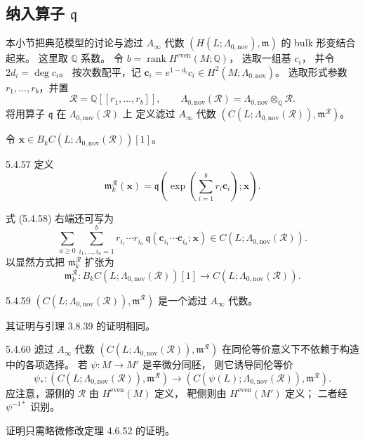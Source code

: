 
\subsection{纳入算子 $\mathfrak q$}
\label{subsec:5-4-5}

本小节把典范模型的讨论与滤过
$A_\infty$ 代数
$(H(L;\Lambda_{0,\mathrm{nov}}),\mathfrak m)$
的 bulk 形变结合起来。
这里取 $\mathbb Q$ 系数。
令
$b=\operatorname{rank}H^{\mathrm{even}}(M;\mathbb Q)$，
选取一组基 $c_i$，
并令 $2d_i=\deg c_i$。
按次数配平，记
$\mathbf c_i=e^{1-d_i}c_i
\in H^2(M;\Lambda_{0,\mathrm{nov}})$。
选取形式参数 $r_1,\ldots,r_b$，并置
\[
\mathcal R=\mathbb Q[[r_1,\ldots,r_b]],
\qquad
\Lambda_{0,\mathrm{nov}}(\mathcal R)
=\Lambda_{0,\mathrm{nov}}
\otimes_{\mathbb Q}\mathcal R.
\]
将用算子 $\mathfrak q$
在 $\Lambda_{0,\mathrm{nov}}(\mathcal R)$ 上
定义滤过 $A_\infty$ 代数
$(C(L;\Lambda_{0,\mathrm{nov}}(\mathcal R)),
\mathfrak m^{\mathcal R})$。

令
$\mathbf x\in
B_kC(L;\Lambda_{0,\mathrm{nov}}(\mathcal R))[1]$。
\begin{definition}{5.4.57}\label{def:5-4-57}
定义
\begin{equation}
\mathfrak m_k^{\mathcal R}(\mathbf x)
=
\mathfrak q\left(
\exp\left(\sum_{i=1}^{b}r_i\mathbf c_i\right);
\mathbf x
\right).
\tag{5.4.58}\label{eq:5-4-58}
\end{equation}
\end{definition}
式 (5.4.58) 右端还可写为
\[
\sum_{a\ge0}
\sum_{i_1,\ldots,i_a=1}^{b}
r_{i_1}\cdots r_{i_a}\,
\mathfrak q
(\mathbf c_{i_1}\cdots\mathbf c_{i_a};\mathbf x)
\in C(L;\Lambda_{0,\mathrm{nov}}(\mathcal R)).
\]
以显然方式把
$\mathfrak m_k^{\mathcal R}$ 扩张为
\[
\mathfrak m_k^{\mathcal R}\colon
B_kC(L;\Lambda_{0,\mathrm{nov}}(\mathcal R))[1]
\longrightarrow
C(L;\Lambda_{0,\mathrm{nov}}(\mathcal R)).
\]

\begin{lemma}{5.4.59}\label{lem:5-4-59}
$(C(L;\Lambda_{0,\mathrm{nov}}(\mathcal R)),
\mathfrak m^{\mathcal R})$
是一个滤过 $A_\infty$ 代数。
\end{lemma}
其证明与引理 3.8.39 的证明相同。

\begin{proposition}{5.4.60}\label{prop:5-4-60}
滤过 $A_\infty$ 代数
$(C(L;\Lambda_{0,\mathrm{nov}}(\mathcal R)),
\mathfrak m^{\mathcal R})$
在同伦等价意义下不依赖于构造中的各项选择。
若 $\psi\colon M\to M'$ 是辛微分同胚，
则它诱导同伦等价
\[
\psi_*\colon
(C(L;\Lambda_{0,\mathrm{nov}}(\mathcal R)),
\mathfrak m^{\mathcal R})
\longrightarrow
(C(\psi(L);\Lambda_{0,\mathrm{nov}}(\mathcal R)),
\mathfrak m^{\mathcal R}).
\]
应注意，源侧的 $\mathcal R$ 由
$H^{\mathrm{even}}(M)$ 定义，
靶侧则由 $H^{\mathrm{even}}(M')$ 定义；
二者经 $\psi^{-1*}$ 识别。
\end{proposition}
证明只需略微修改定理 4.6.52 的证明。

